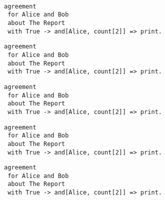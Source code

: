 \begin{minipage}[c]{0.95\textwidth}
\begin{lstlisting}


\end{lstlisting}
\end{minipage} 















\lstset{language=Pucella2006}
\begin{lstlisting}[frame=single, caption={Expressible in ACCPL},label={lst:pucella21example}]
agreement
 for Alice and Bob 
 about The Report 
 with True -> and[Alice, count[2]] => print.
\end{lstlisting}

\lstset{language=Pucella2006}
\begin{lstlisting}[frame=single, caption={Expressible in ACCPL},label={lst:agreementExpressible}]
agreement
 for Alice and Bob 
 about The Report 
 with True -> and[Alice, count[2]] => print.
\end{lstlisting}

\lstset{language=Pucella2006}
\begin{lstlisting}[frame=single, caption={Expressible in ACCPL},label={lst:agreementExpressible}]
agreement
 for Alice and Bob 
 about The Report 
 with True -> and[Alice, count[2]] => print.
\end{lstlisting}

\lstset{language=Pucella2006}
\begin{lstlisting}[frame=single, caption={Expressible in ACCPL},label={lst:agreementExpressible}]
agreement
 for Alice and Bob 
 about The Report 
 with True -> and[Alice, count[2]] => print.
\end{lstlisting}

\lstset{language=Pucella2006}
\begin{lstlisting}[frame=single, caption={Expressible in ACCPL},label={lst:agreementExpressible}]
agreement
 for Alice and Bob 
 about The Report 
 with True -> and[Alice, count[2]] => print.
\end{lstlisting}

